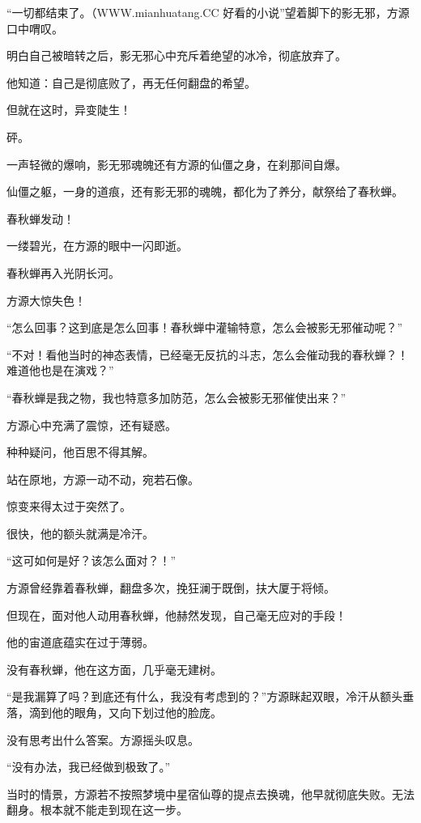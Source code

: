 
\begin{this_body}

“一切都结束了。（WWW.mianhuatang.CC 好看的小说”望着脚下的影无邪，方源口中喟叹。

明白自己被暗转之后，影无邪心中充斥着绝望的冰冷，彻底放弃了。

他知道：自己是彻底败了，再无任何翻盘的希望。

但就在这时，异变陡生！

砰。

一声轻微的爆响，影无邪魂魄还有方源的仙僵之身，在刹那间自爆。

仙僵之躯，一身的道痕，还有影无邪的魂魄，都化为了养分，献祭给了春秋蝉。

春秋蝉发动！

一缕碧光，在方源的眼中一闪即逝。

春秋蝉再入光阴长河。

方源大惊失色！

“怎么回事？这到底是怎么回事！春秋蝉中灌输特意，怎么会被影无邪催动呢？”

“不对！看他当时的神态表情，已经毫无反抗的斗志，怎么会催动我的春秋蝉？！难道他也是在演戏？”

“春秋蝉是我之物，我也特意多加防范，怎么会被影无邪催使出来？”

方源心中充满了震惊，还有疑惑。

种种疑问，他百思不得其解。

站在原地，方源一动不动，宛若石像。

惊变来得太过于突然了。

很快，他的额头就满是冷汗。

“这可如何是好？该怎么面对？！”

方源曾经靠着春秋蝉，翻盘多次，挽狂澜于既倒，扶大厦于将倾。

但现在，面对他人动用春秋蝉，他赫然发现，自己毫无应对的手段！

他的宙道底蕴实在过于薄弱。

没有春秋蝉，他在这方面，几乎毫无建树。

“是我漏算了吗？到底还有什么，我没有考虑到的？”方源眯起双眼，冷汗从额头垂落，滴到他的眼角，又向下划过他的脸庞。

没有思考出什么答案。方源摇头叹息。

“没有办法，我已经做到极致了。”

当时的情景，方源若不按照梦境中星宿仙尊的提点去换魂，他早就彻底失败。无法翻身。根本就不能走到现在这一步。


\end{this_body}
